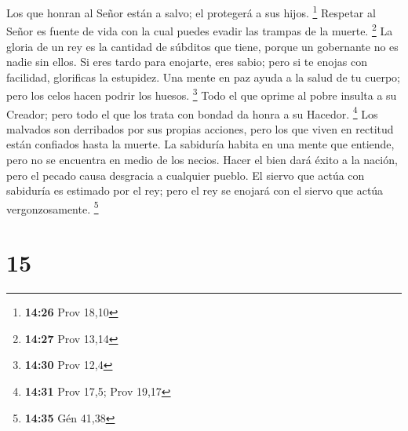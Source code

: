 Los que honran al Señor están a salvo; el protegerá a sus hijos.
\footnote{\textbf{14:26} Prov 18,10}  Respetar al Señor es
fuente de vida con la cual puedes evadir las trampas de la muerte.
\footnote{\textbf{14:27} Prov 13,14}  La gloria de un rey
es la cantidad de súbditos que tiene, porque un gobernante no es nadie
sin ellos.  Si eres tardo para enojarte, eres sabio; pero
si te enojas con facilidad, glorificas la estupidez.  Una
mente en paz ayuda a la salud de tu cuerpo; pero los celos hacen podrir
los huesos. \footnote{\textbf{14:30} Prov 12,4}  Todo el
que oprime al pobre insulta a su Creador; pero todo el que los trata con
bondad da honra a su Hacedor. \footnote{\textbf{14:31} Prov 17,5; Prov
  19,17}  Los malvados son derribados por sus propias
acciones, pero los que viven en rectitud están confiados hasta la
muerte.  La sabiduría habita en una mente que entiende,
pero no se encuentra en medio de los necios.  Hacer el bien
dará éxito a la nación, pero el pecado causa desgracia a cualquier
pueblo.  El siervo que actúa con sabiduría es estimado por
el rey; pero el rey se enojará con el siervo que actúa vergonzosamente.
\footnote{\textbf{14:35} Gén 41,38}

\hypertarget{section-14}{%
\section{15}\label{section-14}}

